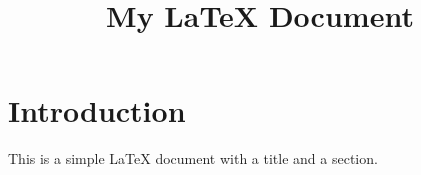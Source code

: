 \documentclass{article}
\title{My LaTeX Document}
\author{}
\date{}
\begin{document}
\maketitle

\section{Introduction}

This is a simple LaTeX document with a title and a section.
\end{document}
